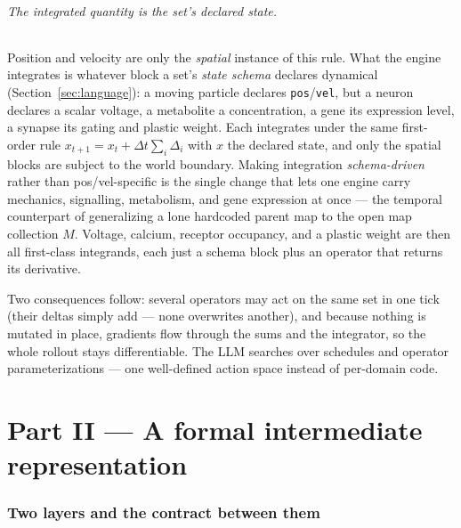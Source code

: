 \documentclass[11pt]{article}
\newcommand{\code}[1]{\texttt{#1}}
\begin{document}
\paragraph{The integrated quantity is the set's declared state.} Position and
velocity are only the \emph{spatial} instance of this rule. What the engine
integrates is whatever block a set's \emph{state schema} declares dynamical
(Section~\ref{sec:language}): a moving particle declares \code{pos}/\code{vel}, but a
neuron declares a scalar voltage, a metabolite a concentration, a gene its expression
level, a synapse its gating and plastic weight. Each integrates under the same
first-order rule $x_{t+1}=x_t+\Delta t\sum_i\Delta_i$ with $x$ the declared state,
and only the spatial blocks are subject to the world boundary. Making integration
\emph{schema-driven} rather than pos/vel-specific is the single change that lets one
engine carry mechanics, signalling, metabolism, and gene expression at once --- the
temporal counterpart of generalizing a lone hardcoded parent map to the open map
collection $M$. Voltage, calcium, receptor occupancy, and a plastic weight are then
all first-class integrands, each just a schema block plus an operator that returns
its derivative.

Two consequences follow: several operators may
act on the same set in one tick (their deltas simply add --- none overwrites
another), and because nothing is mutated in place, gradients flow through the sums
and the integrator, so the whole rollout stays differentiable. The LLM searches over
schedules and operator parameterizations --- one well-defined action space instead
of per-domain code.

\part*{Part II --- A formal intermediate representation}

\section{Two layers and the contract between them}
\end{document}
